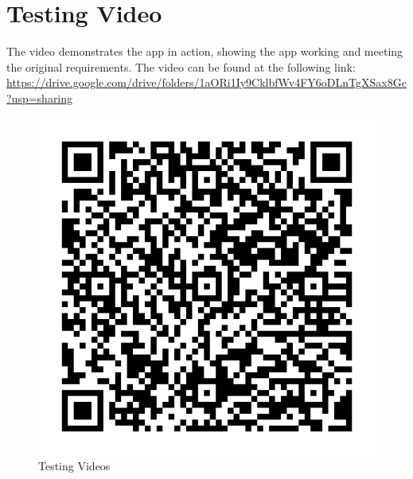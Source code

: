 \section{Testing Video}
The video demonstrates the app in action, showing the app working and meeting the original requirements. The video can be found at the following link: \url{https://drive.google.com/drive/folders/1aORi1Iy9CklbfWv4FY6oDLnTgXSax8Gc?usp=sharing}
\begin{figure}[H]
    \centering
    \includegraphics[width=\textwidth]{Assets/qr_videos.png}
    \caption{Testing Videos}
    \label{fig:testing_video}
\end{figure}

